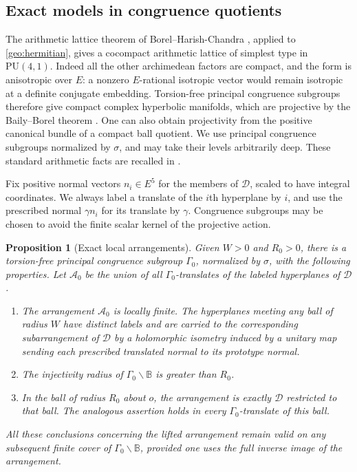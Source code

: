 \documentclass[11pt,reqno]{amsart}
\numberwithin{equation}{section}
\newtheorem{proposition}[theorem]{Proposition}
\theoremstyle{definition}
\theoremstyle{remark}
\begin{document}
\subsection{Exact models in congruence quotients}\label{geo:separation}

The arithmetic lattice theorem of Borel--Harish-Chandra
\cite[Corollary~12.4]{BorelHarishChandra1962}, applied to
\eqref{geo:hermitian}, gives a
cocompact arithmetic lattice of simplest type in $\mathrm{PU}(4,1)$.
Indeed all the other archimedean factors are compact, and the form is
anisotropic over $E$: a nonzero $E$-rational isotropic vector would
remain isotropic at a definite conjugate embedding.  Torsion-free
principal congruence subgroups therefore give compact complex
hyperbolic manifolds, which are projective by the Baily--Borel theorem
\cite[Theorem~10.11]{BailyBorel1966}.  One can
also obtain projectivity from the positive canonical bundle of a
compact ball quotient.  We use principal congruence subgroups normalized
by $\sigma$, and may take their levels arbitrarily deep.  These standard
arithmetic facts are recalled in \cite[Section~3.1]{StoverToledo}.

Fix positive normal vectors $n_i\in E^5$ for the members of $\mathcal D$,
scaled to have integral coordinates.  We always label a translate of
the $i$th hyperplane by $i$, and use the prescribed normal $\gamma n_i$
for its translate by $\gamma$.  Congruence subgroups may be chosen to
avoid the finite scalar kernel of the projective action.

\begin{proposition}[Exact local arrangements]\label{prop:arrangement-local}
Given $W>0$ and $R_0>0$, there is a torsion-free principal congruence
subgroup $\Gamma_0$, normalized by $\sigma$, with the following
properties.  Let $\mathcal A_0$ be the union of all $\Gamma_0$-translates
of the labeled hyperplanes of $\mathcal D$.
\begin{enumerate}
\item The arrangement $\mathcal A_0$ is locally finite.  The hyperplanes
meeting any ball of radius $W$ have distinct labels and are carried to
the corresponding subarrangement of $\mathcal D$ by a holomorphic isometry
induced by a unitary map sending each prescribed translated normal to
its prototype normal.
\item The injectivity radius of $\Gamma_0\backslash\mathbb B$ is greater than
$R_0$.
\item In the ball of radius $R_0$ about $o$, the arrangement is exactly
$\mathcal D$ restricted to that ball.  The analogous assertion holds in every
$\Gamma_0$-translate of this ball.
\end{enumerate}
All these conclusions concerning the lifted arrangement remain valid
on any subsequent finite cover of $\Gamma_0\backslash\mathbb B$, provided one
uses the full inverse image of the arrangement.
\end{proposition}
\end{document}
